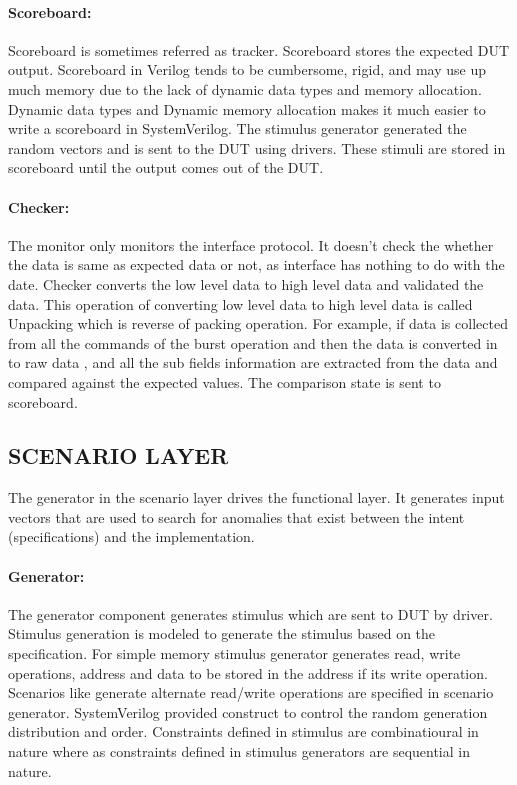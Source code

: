 \paragraph{Scoreboard:} Scoreboard is sometimes referred as tracker. Scoreboard stores the expected DUT output. Scoreboard in Verilog tends to be cumbersome, rigid, and may use up much memory due to the lack of dynamic data types and memory allocation. Dynamic data types and Dynamic memory allocation makes it much easier to write a scoreboard in SystemVerilog. The stimulus generator generated the random vectors and is sent to the DUT using drivers. These stimuli are stored in scoreboard until the output comes out of the DUT.
\paragraph{Checker:} The monitor only monitors the interface protocol. It doesn't check the whether the data is same as expected data or not, as interface has nothing to do with the date. Checker converts the low level data to high level data and validated the data. This operation of converting low level data to high level data is called Unpacking which is reverse of packing operation. For example, if data is collected from all the commands of the burst operation and then the data is converted in to raw data , and all the sub fields information are extracted from the data and compared against the expected values. The comparison state is sent to scoreboard. 

\subsection{SCENARIO LAYER}
The generator in the scenario layer drives the functional layer. It generates input vectors that are used to search for anomalies that exist between the intent (specifications) and the implementation.
\paragraph{Generator:} The generator component generates stimulus which are sent to DUT by driver. Stimulus generation is modeled to generate the stimulus based on the specification. For simple memory stimulus generator generates read, write operations, address and data to be stored in the address if its write operation. Scenarios like generate alternate read/write operations are specified in scenario generator. SystemVerilog provided construct to control the random generation distribution and order. Constraints defined in stimulus are combinatioural in nature where as constraints defined in stimulus generators are sequential in nature. 

